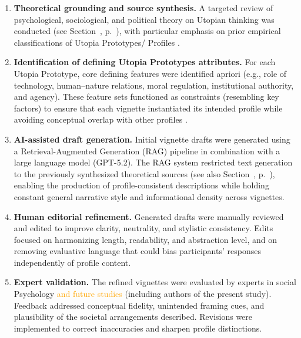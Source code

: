 \documentclass[jou,floatsintext]{apa7}
\begin{document}
\begin{enumerate}
    \item \textbf{Theoretical grounding and source synthesis.} A targeted review of psychological, sociological, and political theory on Utopian thinking was conducted (see Section~, p.~\pageref{sec:knowledgeBase}), with particular emphasis on prior empirical classifications of Utopia Prototypes/ Profiles \parencite{fernandoGreensSpaceInvaders2020, fernandoProfilesIdealSociety2023, kashimaCollectiveFutureThinking2025, lizzio-wilsonWhatCouldBe2025}.
    
    \item \textbf{Identification of defining Utopia Prototypes attributes.} For each Utopia Prototype, core defining features were identified apriori (e.g., role of technology, human–nature relations, moral regulation, institutional authority, and agency). These feature sets functioned as constraints (resembling key factors) to ensure that each vignette instantiated its intended profile while avoiding conceptual overlap with other profiles \parencite[see recommendations in][]{kosowMethodsFutureScenario2008, mietznerAdvantagesDisadvantagesScenario2005, schwartzArtLongView1991, wiebeScenarioDevelopmentForesight2018}.
    
    \item \textbf{AI-assisted draft generation.} Initial vignette drafts were generated using a Retrieval-Augmented Generation (RAG) pipeline in combination with a large language model (GPT-5.2). The RAG system restricted text generation to the previously synthesized theoretical sources (see also Section~, p.~\pageref{sec:knowledgeBase}), enabling the production of profile-consistent descriptions while holding constant general narrative style and informational density across vignettes.
    
    \item \textbf{Human editorial refinement.} Generated drafts were manually reviewed and edited to improve clarity, neutrality, and stylistic consistency. Edits focused on harmonizing length, readability, and abstraction level, and on removing evaluative language that could bias participants’ responses independently of profile content.
    
    \item \textbf{Expert validation.} The refined vignettes were evaluated by experts in social Psychology \textcolor{orange}{and future studies} (including authors of the present study). Feedback addressed conceptual fidelity, unintended framing cues, and plausibility of the societal arrangements described. Revisions were implemented to correct inaccuracies and sharpen profile distinctions.


\end{enumerate}
\end{document}
